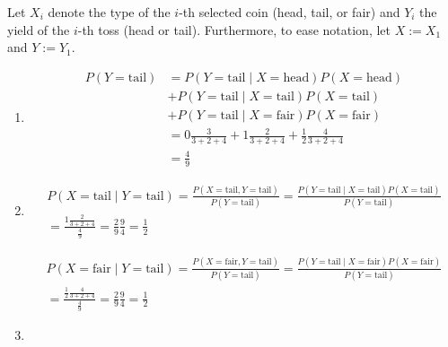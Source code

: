 \begin{solution}

Let $X_i$ denote the type of the $i$-th selected coin (head, tail, or fair) and $Y_i$ the yield of the $i$-th toss (head or tail).
Furthermore, to ease notation, let $X := X_1$ and $Y := Y_1$.

\begin{enumerate}[label = (\alph*)]

    \item

    \begin{align*}
        P(Y = \mathrm{tail})
        & =
        P(Y = \mathrm{tail} \mid X = \mathrm{head}) P(X = \mathrm{head}) \\
        & +
        P(Y = \mathrm{tail} \mid X = \mathrm{tail}) P(X = \mathrm{tail}) \\
        & +
        P(Y = \mathrm{tail} \mid X = \mathrm{fair}) P(X = \mathrm{fair}) \\
        & =
        0 \frac{3}{3 + 2 + 4} + 1 \frac{2}{3 + 2 + 4} + \frac{1}{2} \frac{4}{3 + 2 + 4} \\
        & =
        \frac{4}{9}
    \end{align*}

    \item

    \begin{multline*}
        P(X = \mathrm{tail} \mid Y = \mathrm{tail})
        =
        \frac{P(X = \mathrm{tail}, Y = \mathrm{tail})}{P(Y = \mathrm{tail})}
        =
        \frac{P(Y = \mathrm{tail} \mid X = \mathrm{tail}) P(X = \mathrm{tail})}{P(Y = \mathrm{tail})} \\
        =
        \frac{1 \frac{2}{3 + 2 + 4}}{\frac{4}{9}}
        =
        \frac{2}{9} \frac{9}{4}
        =
        \frac{1}{2}
    \end{multline*}

    \begin{multline*}
        P(X = \mathrm{fair} \mid Y = \mathrm{tail})
        =
        \frac{P(X = \mathrm{fair}, Y = \mathrm{tail})}{P(Y = \mathrm{tail})}
        =
        \frac{P(Y = \mathrm{tail} \mid X = \mathrm{fair}) P(X = \mathrm{fair})}{P(Y = \mathrm{tail})} \\
        =
        \frac{\frac{1}{2} \frac{4}{3 + 2 + 4}}{\frac{4}{9}}
        =
        \frac{2}{9} \frac{9}{4}
        =
        \frac{1}{2}
    \end{multline*}

    \item


\end{enumerate}
\end{solution}
